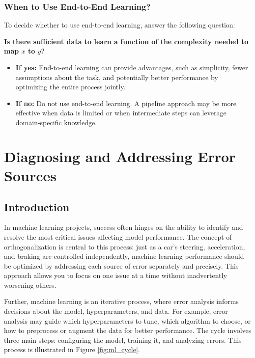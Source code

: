 \documentclass[12pt,openany, draft]{book}
\begin{document}
\subsection{When to Use End-to-End Learning?}
To decide whether to use end-to-end learning, answer the following question: \newline

\textbf{Is there sufficient data to learn a function of the complexity needed to map \(x\) to \(y\)?} 
\begin{itemize}
    \item \textbf{If yes:} End-to-end learning can provide advantages, such as simplicity, fewer assumptions about the task, and potentially better performance by optimizing the entire process jointly.
    \item \textbf{If no:} Do not use end-to-end learning. A pipeline approach may be more effective when data is limited or when intermediate steps can leverage domain-specific knowledge.
\end{itemize}




\chapter{Diagnosing and Addressing Error Sources}

\section*{Introduction}

In machine learning projects, success often hinges on the ability to identify and resolve the most critical issues affecting model performance. The concept of orthogonalization is central to this process: just as a car’s steering, acceleration, and braking are controlled independently, machine learning performance should be optimized by addressing each source of error separately and precisely. This approach allows you to focus on one issue at a time without inadvertently worsening others. \newline

Further, machine learning is an iterative process, where error analysis informs decisions about the model, hyperparameters, and data. For example, error analysis may guide which hyperparameters to tune, which algorithm to choose, or how to preprocess or augment the data for better performance. The cycle involves three main steps: configuring the model, training it, and analyzing errors. This process is illustrated in Figure \ref{fig:ml_cycle}. \newline
\end{document}

